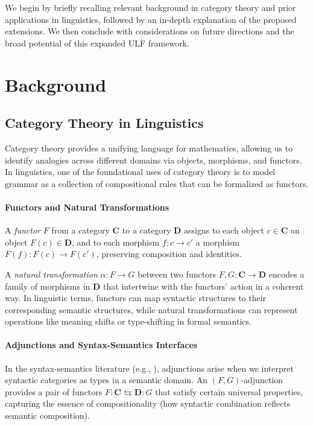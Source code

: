 \documentclass[12pt]{article}
\theoremstyle{plain}
\theoremstyle{definition}
\begin{document}
We begin by briefly recalling relevant background in category theory and prior applications in linguistics, followed by an in-depth explanation of the proposed extensions. We then conclude with considerations on future directions and the broad potential of this expanded ULF framework.

\section{Background}
\subsection{Category Theory in Linguistics}
Category theory provides a unifying language for mathematics, allowing us to identify analogies across different domains via objects, morphisms, and functors. In linguistics, one of the foundational uses of category theory is to model grammar as a collection of compositional rules that can be formalized as functors. 

\paragraph{Functors and Natural Transformations}
A \emph{functor} \(F\) from a category \(\mathbf{C}\) to a category \(\mathbf{D}\) assigns to each object \(c \in \mathbf{C}\) an object \(F(c) \in \mathbf{D}\), and to each morphism \(f: c \to c'\) a morphism \(F(f): F(c) \to F(c')\), preserving composition and identities. 

A \emph{natural transformation} \(\alpha: F \to G\) between two functors \(F, G: \mathbf{C} \to \mathbf{D}\) encodes a family of morphisms in \(\mathbf{D}\) that intertwine with the functors' action in a coherent way. In linguistic terms, functors can map syntactic structures to their corresponding semantic structures, while natural transformations can represent operations like meaning shifts or type-shifting in formal semantics.

\paragraph{Adjunctions and Syntax-Semantics Interfaces}
In the syntax-semantics literature (e.g., \cite{BarkerShan2014}), adjunctions arise when we interpret syntactic categories as types in a semantic domain. An \((F, G)\)-adjunction provides a pair of functors \(F: \mathbf{C} \leftrightarrows \mathbf{D} : G\) that satisfy certain universal properties, capturing the essence of compositionality (how syntactic combination reflects semantic composition).
\end{document}
